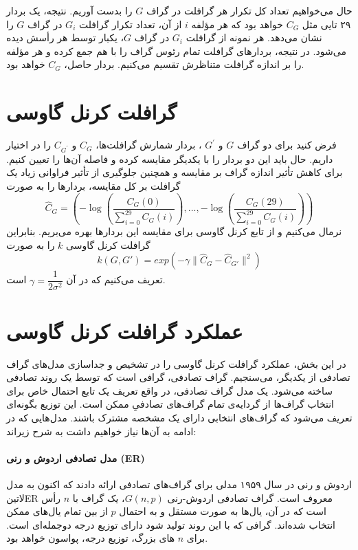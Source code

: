 حال می‌خواهیم تعداد کل تکرار هر گرافلت‌ در گراف $G$ را بدست آوریم. نتیجه، یک بردار ۲۹ تایی مثل $C_G$ خواهد بود که هر مؤلفه $i$ از آن، تعداد تکرار گرافلت $G_i$ در گراف $G$ را نشان می‌دهد. هر نمونه از گرافلت $G_i$ در گراف $G$، یکبار توسط هر رأسش دیده می‌شود. در نتیجه، بردارهای گرافلت تمام رئوس گراف را با هم جمع کرده و هر مؤلفه را بر اندازه گرافلت متناظرش تقسیم می‌کنیم. بردار حاصل، $C_G$ خواهد بود.

\section{گرافلت کرنل گاوسی}
فرض کنید برای دو گراف $G$ و $G^\prime$ ، بردار شمارش گرافلت‌ها، $C_G$ و $C_{G^\prime}$ را در اختیار داریم. حال باید این دو بردار را با یکدیگر مقایسه کرده و فاصله آن‌ها را تعیین کنیم. برای کاهش تأثیر اندازه گراف‌ بر مقایسه و همچنین جلوگیری از تأثیر فراوانی زیاد یک گرافلت بر کل مقایسه، بردارها را به صورت
\begin{equation}
\label{eq:feature-vector}
\hat{C}_G = (-\log(\dfrac{C_G(0)}{\sum _{i=0}^{29} C_G(i)}),...,-\log(\dfrac{C_G(29)}{\sum _{i=0}^{29} C_G(i)}))
\end{equation}
نرمال می‌کنیم و از تابع کرنل گاوسی برای مقایسه این بردارها بهره می‌بریم. بنابراین گرافلت کرنل گاوسی $k$ را به صورت
\begin{equation}
\label{eqn:kernelfunction}
k(G,G') = exp(-\gamma\parallel \hat{C}_G - \hat{C}_{G'}\parallel^2)
\end{equation}
تعریف می‌کنیم که در آن $\gamma = \dfrac{1}{2\sigma^2}$ است.

\section{عملکرد گرافلت کرنل گاوسی}
در این بخش، عملکرد گرافلت کرنل گاوسی را در تشخیص و جداسازی مدل‌های گراف تصادفی از یکدیگر، می‌سنجیم. گراف تصادفی، گرافی است که توسط یک روند تصادفی ساخته می‌شود. یک مدل‌ گراف تصادفی، در واقع تعریف یک تابع احتمال خاص برای انتخاب گراف‌ها از گردایه‌ی تمام گراف‌های تصادفیِ ممکن است. این توزیع بگونه‌ای تعریف می‌شود که گراف‌های انتخابی دارای یک مشخصه مشترک باشند. مدل‌هایی که در ادامه به آن‌ها نیاز خواهیم داشت به شرح زیراند:

\paragraph{مدل تصادفی اردوش و رنی (ER)}
اردوش و رنی در سال ۱۹۵۹ مدلی برای گراف‌های تصادفی ارائه دادند که اکنون به مدل ‌لاتین{ER} معروف است. گراف تصادفی اردوش-رنی $G(n,p)$، یک گراف با $n$ رأس است که در آن، یال‌ها به صورت مستقل و به احتمال $p$ از بین تمام یال‌های ممکن انتخاب شده‌اند. گرافی که با این روند تولید شود دارای توزیع درجه دوجمله‌ای است. برای $n$ های بزرگ، توزیع درجه، پواسون خواهد بود.

